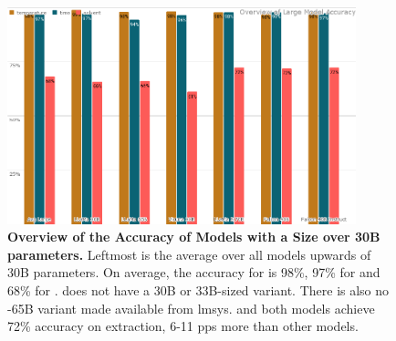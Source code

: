 \begin{figure}[!htbp]
    \begin{centering}
        \includegraphics[width=0.9\textwidth]{img/overview_large_accuracy}
        \caption[Overview of Large Model Accuracy]{\textbf{Overview of the Accuracy of Models with a Size over 30B parameters.}
        Leftmost is the average over all models upwards of 30B parameters.
        On average, the accuracy for \ttemp is 98\%, 97\% for \ttime and 68\% for \tsolv.
         does not have a 30B or 33B-sized variant.
        There is also no -65B variant made available from \gls{lmsys}.
         and both  models achieve 72\% accuracy on \tsolv extraction, 6-11 \glspl{pp} more than other models.
        }
        \label{fig:large_acc}
    \end{centering}
\end{figure}
